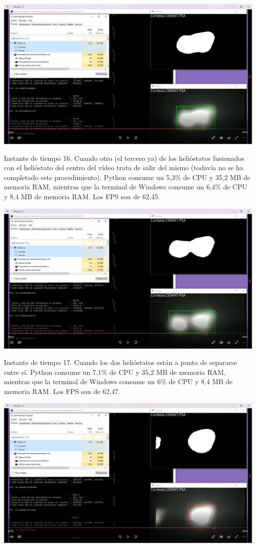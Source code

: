 \documentclass[12pt]{article}
\begin{document}
\includegraphics[width=\textwidth]{CapturasRendimientoSoftware1/Imagen16.png}

Instante de tiempo 16. Cuando otro (el tercero ya) de los helióstatos fusionados con el helióstato del centro del vídeo trata de salir del mismo (todavía no se ha completado este procedimiento). Python consume un 5,3\% de CPU y 35,2 MB de memoria RAM, mientras que la terminal de Windows consume un 6,4\% de CPU y 8,4 MB de memoria RAM. Los FPS son de 62,45.


\includegraphics[width=\textwidth]{CapturasRendimientoSoftware1/Imagen17.png}

Instante de tiempo 17. Cuando los dos helióstatos están a punto de separarse entre sí. Python consume un 7,1\% de CPU y 35,2 MB de memoria RAM, mientras que la terminal de Windows consume un 6\% de CPU y 8,4 MB de memoria RAM. Los FPS son de 62,47.


\includegraphics[width=\textwidth]{CapturasRendimientoSoftware1/Imagen18.png}
\end{document}
